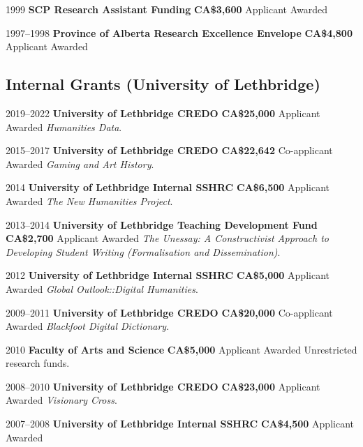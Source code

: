 \documentclass[11pt,letterpaper,sans]{moderncv}
\begin{document}
{\cventry
  {1999}
  {\textbf{SCP Research Assistant Funding}}
  {\textbf{CA\$3{,}600}}
  {Applicant}
  {Awarded}
  {}

\cventry
  {1997--1998}
  {\textbf{Province of Alberta Research Excellence Envelope}}
  {\textbf{CA\$4{,}800}}
  {Applicant}
  {Awarded}
  {}

\subsection*{\textbf{Internal Grants (University of Lethbridge)}}

\vspace{1em}

\cventry
  {2019--2022}
  {\textbf{University of Lethbridge CREDO}}
  {\textbf{CA\$25{,}000}}
  {Applicant}
  {Awarded}
  {\emph{Humanities Data}.}

\cventry
  {2015--2017}
  {\textbf{University of Lethbridge CREDO}}
  {\textbf{CA\$22{,}642}}
  {Co-applicant}
  {Awarded}
  {\emph{Gaming and Art History}.}

\cventry
  {2014}
  {\textbf{University of Lethbridge Internal SSHRC}}
  {\textbf{CA\$6{,}500}}
  {Applicant}
  {Awarded}
  {\emph{The New Humanities Project}.}

\cventry
  {2013--2014}
  {\textbf{University of Lethbridge Teaching Development Fund}}
  {\textbf{CA\$2{,}700}}
  {Applicant}
  {Awarded}
  {\emph{The Unessay: A Constructivist Approach to Developing Student Writing (Formalisation and Dissemination)}.}

\cventry
  {2012}
  {\textbf{University of Lethbridge Internal SSHRC}}
  {\textbf{CA\$5{,}000}}
  {Applicant}
  {Awarded}
  {\emph{Global Outlook::Digital Humanities}.}

\cventry
  {2009--2011}
  {\textbf{University of Lethbridge CREDO}}
  {\textbf{CA\$20{,}000}}
  {Co-applicant}
  {Awarded}
  {\emph{Blackfoot Digital Dictionary}.}

\cventry
  {2010}
  {\textbf{Faculty of Arts and Science}}
  {\textbf{CA\$5{,}000}}
  {Applicant}
  {Awarded}
  {Unrestricted research funds.}

\cventry
  {2008--2010}
  {\textbf{University of Lethbridge CREDO}}
  {\textbf{CA\$23{,}000}}
  {Applicant}
  {Awarded}
  {\emph{Visionary Cross}.}

\cventry
  {2007--2008}
  {\textbf{University of Lethbridge Internal SSHRC}}
  {\textbf{CA\$4{,}500}}
  {Applicant}
  {Awarded}
  {}

}
\end{document}
